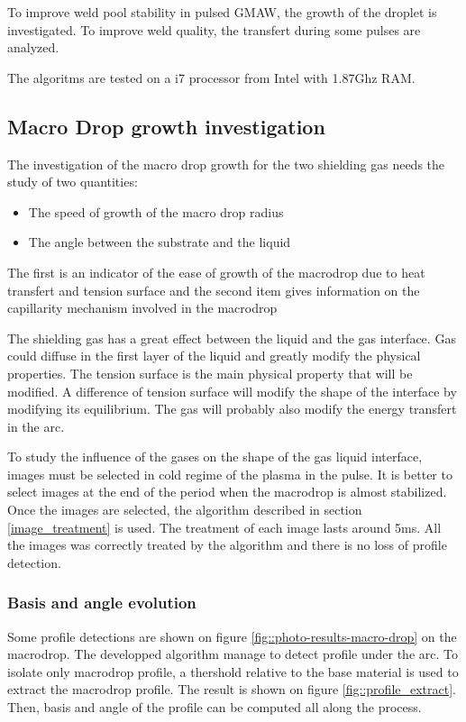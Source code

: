 \documentclass[12pt]{iopart}
\begin{document}
To improve weld pool stability in pulsed GMAW, the growth of the droplet is investigated.
To improve weld quality, the transfert during some pulses are analyzed.

The algoritms are tested on a i7 processor from Intel with 1.87Ghz RAM.


\subsection{ Macro Drop growth investigation}
\label{macro_drop_growth_investigation}

The investigation of the macro drop growth for the two shielding gas needs the study of two quantities:

\begin{itemize}
\item The speed of growth of the macro drop radius
\item The angle between the substrate and the liquid
\end{itemize}

The first is an indicator of the ease of growth of the macrodrop due to
heat transfert and tension surface and the second  item gives information
 on the capillarity mechanism involved in the macrodrop


The shielding gas has a great effect between the liquid and the gas interface. Gas could diffuse in the
first layer of the liquid and greatly modify the physical properties. The tension surface is the main physical
property that will be modified. A difference of tension surface will modify the shape of the interface by modifying
its equilibrium. The gas will probably also modify the energy transfert in the arc.

 To study the influence of the gases on the shape of the gas liquid interface, images must be selected in cold
regime of the plasma in the pulse. It is better to select images at the end of the period when the macrodrop is
almost stabilized. Once the images are selected, the algorithm described in section \ref{image_treatment} is used.
The treatment of each image lasts around 5ms. All the images was correctly treated by the algorithm and there is no loss
of profile detection.

\subsubsection{Basis and angle evolution} 
\label{basis_and_angle_evolution}
Some profile detections are shown on figure \ref{fig::photo-results-macro-drop} on the macrodrop.
 The developped algorithm manage to detect profile under the arc.
 To isolate only macrodrop profile, a thershold relative to the base material is used to extract the macrodrop profile.
The result is shown on figure \ref{fig::profile_extract}. Then, basis and angle of the profile can be computed
all along  the process.
\end{document}
